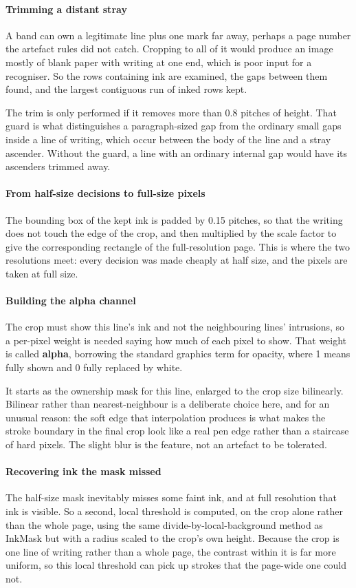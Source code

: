 \paragraph{Trimming a distant stray}
A band can own a legitimate line plus one mark far away, perhaps a page number the artefact rules did not catch. Cropping to all of it would produce an image mostly of blank paper with writing at one end, which is poor input for a recogniser. So the rows containing ink are examined, the gaps between them found, and the largest contiguous run of inked rows kept.

The trim is only performed if it removes more than 0.8 pitches of height. That guard is what distinguishes a paragraph-sized gap from the ordinary small gaps inside a line of writing, which occur between the body of the line and a stray ascender. Without the guard, a line with an ordinary internal gap would have its ascenders trimmed away.


\paragraph{From half-size decisions to full-size pixels}
The bounding box of the kept ink is padded by 0.15 pitches, so that the writing does not touch the edge of the crop, and then multiplied by the scale factor to give the corresponding rectangle of the full-resolution page. This is where the two resolutions meet: every decision was made cheaply at half size, and the pixels are taken at full size.


\paragraph{Building the alpha channel}
The crop must show this line's ink and not the neighbouring lines' intrusions, so a per-pixel weight is needed saying how much of each pixel to show. That weight is called \textbf{alpha}, borrowing the standard graphics term for opacity, where 1 means fully shown and 0 fully replaced by white.

It starts as the ownership mask for this line, enlarged to the crop size bilinearly. Bilinear rather than nearest-neighbour is a deliberate choice here, and for an unusual reason: the soft edge that interpolation produces is what makes the stroke boundary in the final crop look like a real pen edge rather than a staircase of hard pixels. The slight blur is the feature, not an artefact to be tolerated.


\paragraph{Recovering ink the mask missed}
The half-size mask inevitably misses some faint ink, and at full resolution that ink is visible. So a second, local threshold is computed, on the crop alone rather than the whole page, using the same divide-by-local-background method as InkMask but with a radius scaled to the crop's own height. Because the crop is one line of writing rather than a whole page, the contrast within it is far more uniform, so this local threshold can pick up strokes that the page-wide one could not.

